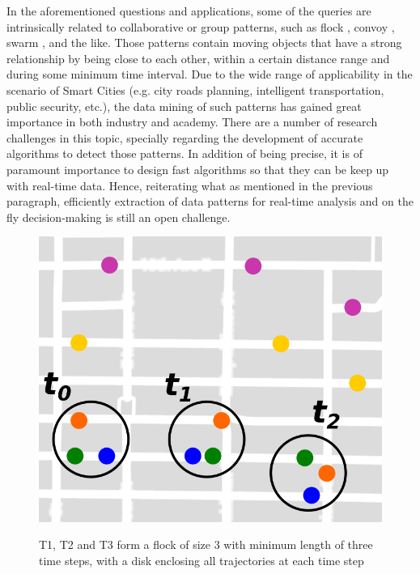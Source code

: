 In the aforementioned questions and applications, some of the queries are intrinsically related to collaborative or
group patterns, such as flock \citep{gudefficient}, convoy \citep{convoy}, swarm \citep{swarm}, and the like. Those
patterns contain moving objects that have a strong relationship by being close to each other, within a certain distance
range and during some minimum time interval. Due to the wide range of applicability in the scenario of Smart Cities
(e.g. city roads planning, intelligent transportation, public security, etc.), the data mining of such patterns has
gained great importance in both industry and academy. There are a number of research challenges in this topic, specially
regarding the development of accurate algorithms to detect those patterns. In addition of being precise, it is of
paramount importance to design fast algorithms so that they can be keep up with real-time data. Hence, reiterating what
as mentioned in the previous paragraph, efficiently extraction of data patterns for real-time analysis and on the fly
decision-making is still an open challenge.
%
%

\begin{figure}[h!]
    \centering
    \caption{T1, T2 and T3 form a flock of size 3 with minimum length of three time steps, with a disk enclosing all
        trajectories at each time step}
    \includegraphics[width=0.7\linewidth]{images/flock_pattern.png}
    \label{fig:flocks}
\end{figure}

